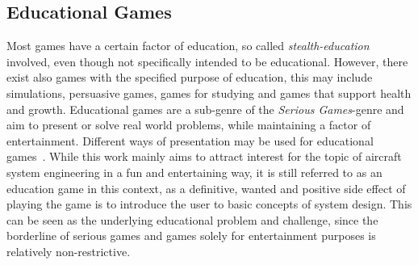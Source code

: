 \subsection{Educational Games}\label{subsec:educational-games}
Most games have a certain factor of education, so called \textit{stealth-education} involved, even though not
specifically intended to be educational.
However, there exist also games with the specified purpose of education, this may include simulations, persuasive games,
games for studying and games that support health and growth.
Educational games are a sub-genre of the \textit{Serious Games}-genre and aim to present or solve real world problems,
while maintaining a factor of entertainment.
Different ways of presentation may be used for educational games~\cite[p.43]{10.5555/2544002}.
While this work mainly aims to attract interest for the topic of aircraft system engineering in a fun and entertaining way, it is still
referred to as an education game in this context, as a definitive, wanted and positive side effect of playing the game is
to introduce the user to basic concepts of system design.
This can be seen as the underlying educational problem and challenge, since the borderline of serious games and games solely
for entertainment purposes is relatively non-restrictive.


